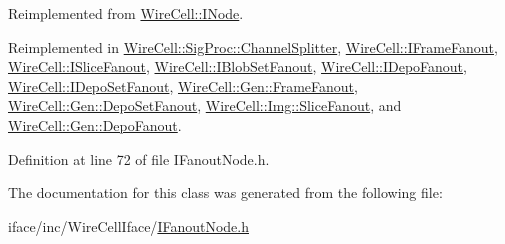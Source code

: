 Reimplemented from \hyperlink{class_wire_cell_1_1_i_node_aba7e537684cb4f2453796ff73da2d602}{Wire\+Cell\+::\+I\+Node}.



Reimplemented in \hyperlink{class_wire_cell_1_1_sig_proc_1_1_channel_splitter_aae5dd9627d127e38fd31d88a4b61b584}{Wire\+Cell\+::\+Sig\+Proc\+::\+Channel\+Splitter}, \hyperlink{class_wire_cell_1_1_i_frame_fanout_aa54a33e4454b6d2cced872b903641d4a}{Wire\+Cell\+::\+I\+Frame\+Fanout}, \hyperlink{class_wire_cell_1_1_i_slice_fanout_abde53bdfe0cef64ba3b05edcf111db65}{Wire\+Cell\+::\+I\+Slice\+Fanout}, \hyperlink{class_wire_cell_1_1_i_blob_set_fanout_ad70f90237cc742ff5bdac87c661ed644}{Wire\+Cell\+::\+I\+Blob\+Set\+Fanout}, \hyperlink{class_wire_cell_1_1_i_depo_fanout_ade8cfbdf790d316516ab8f7a97818f8e}{Wire\+Cell\+::\+I\+Depo\+Fanout}, \hyperlink{class_wire_cell_1_1_i_depo_set_fanout_a90833e933801d4152272189dc6ba1e38}{Wire\+Cell\+::\+I\+Depo\+Set\+Fanout}, \hyperlink{class_wire_cell_1_1_gen_1_1_frame_fanout_a71041fd4bf1a0e030e78a7565f7f1671}{Wire\+Cell\+::\+Gen\+::\+Frame\+Fanout}, \hyperlink{class_wire_cell_1_1_gen_1_1_depo_set_fanout_a11637470dcf8dc0ea0cbf6691a6984c0}{Wire\+Cell\+::\+Gen\+::\+Depo\+Set\+Fanout}, \hyperlink{class_wire_cell_1_1_img_1_1_slice_fanout_a98fe441e7e47306ff0352f547e9b9066}{Wire\+Cell\+::\+Img\+::\+Slice\+Fanout}, and \hyperlink{class_wire_cell_1_1_gen_1_1_depo_fanout_acb986929b5cd38a5ea197985b103102f}{Wire\+Cell\+::\+Gen\+::\+Depo\+Fanout}.



Definition at line 72 of file I\+Fanout\+Node.\+h.



The documentation for this class was generated from the following file\+:\begin{DoxyCompactItemize}
\item 
iface/inc/\+Wire\+Cell\+Iface/\hyperlink{_i_fanout_node_8h}{I\+Fanout\+Node.\+h}\end{DoxyCompactItemize}

